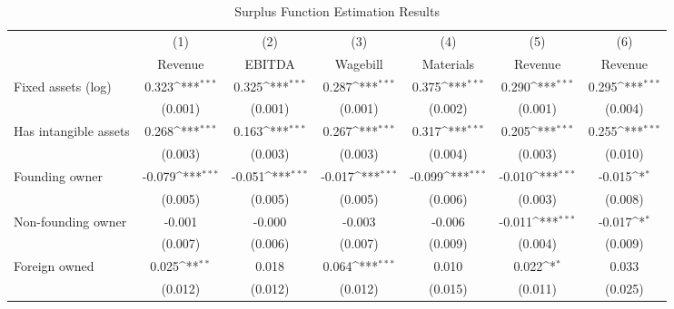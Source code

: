 \begin{table}[htbp]\centering
\def\sym#1{\ifmmode^{#1}\else\(^{#1}\)\fi}
\caption{Surplus Function Estimation Results}
\begin{tabular}{l*{6}{c}}
\toprule
                    &\multicolumn{1}{c}{(1)}&\multicolumn{1}{c}{(2)}&\multicolumn{1}{c}{(3)}&\multicolumn{1}{c}{(4)}&\multicolumn{1}{c}{(5)}&\multicolumn{1}{c}{(6)}\\
                    &\multicolumn{1}{c}{Revenue}&\multicolumn{1}{c}{EBITDA}&\multicolumn{1}{c}{Wagebill}&\multicolumn{1}{c}{Materials}&\multicolumn{1}{c}{Revenue}&\multicolumn{1}{c}{Revenue}\\
\midrule
Fixed assets (log)  &       0.323\sym{***}&       0.325\sym{***}&       0.287\sym{***}&       0.375\sym{***}&       0.290\sym{***}&       0.295\sym{***}\\
                    &     (0.001)         &     (0.001)         &     (0.001)         &     (0.002)         &     (0.001)         &     (0.004)         \\
\addlinespace
Has intangible assets&       0.268\sym{***}&       0.163\sym{***}&       0.267\sym{***}&       0.317\sym{***}&       0.205\sym{***}&       0.255\sym{***}\\
                    &     (0.003)         &     (0.003)         &     (0.003)         &     (0.004)         &     (0.003)         &     (0.010)         \\
\addlinespace
Founding owner      &      -0.079\sym{***}&      -0.051\sym{***}&      -0.017\sym{***}&      -0.099\sym{***}&      -0.010\sym{***}&      -0.015\sym{*}  \\
                    &     (0.005)         &     (0.005)         &     (0.005)         &     (0.006)         &     (0.003)         &     (0.008)         \\
\addlinespace
Non-founding owner  &      -0.001         &      -0.000         &      -0.003         &      -0.006         &      -0.011\sym{***}&      -0.017\sym{*}  \\
                    &     (0.007)         &     (0.006)         &     (0.007)         &     (0.009)         &     (0.004)         &     (0.009)         \\
\addlinespace
Foreign owned       &       0.025\sym{**} &       0.018         &       0.064\sym{***}&       0.010         &       0.022\sym{*}  &       0.033         \\
                    &     (0.012)         &     (0.012)         &     (0.012)         &     (0.015)         &     (0.011)         &     (0.025)         \\

\end{tabular}
\end{table}
